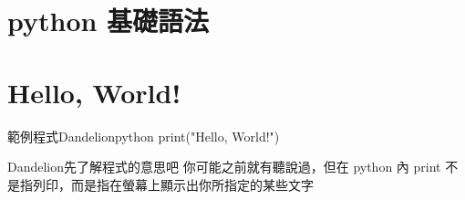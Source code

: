 \documentclass{article}
\begin{document}
\begin{large}

\section{python 基礎語法}
\section{Hello, World!}
\begin{mintbox}{範例程式}{Dandelion}{python}
print("Hello, World!")
\end{mintbox}

\begin{boxpar}{Dandelion}{先了解程式的意思吧}
    你可能之前就有聽說過，但在 python 內 print 不是指列印，而是指在螢幕上顯示出你所指定的某些文字
\end{boxpar}

\end{large}
\end{document}
